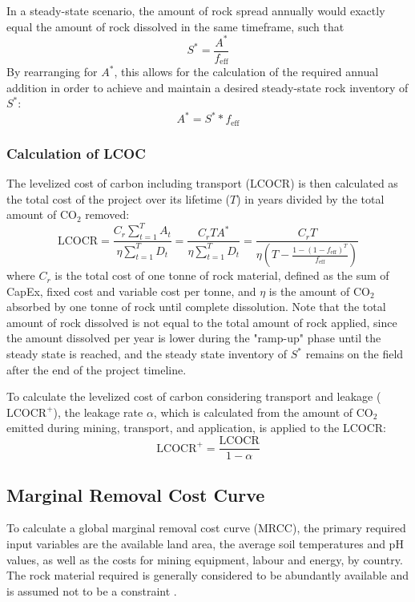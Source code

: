 In a steady-state scenario, the amount of rock spread annually would exactly equal the amount of rock dissolved in the same timeframe, such that
\begin{equation}
  S^* = \frac{A^*}{f_{\text{eff}}}
\end{equation}
By rearranging for \(A^*\), this allows for the calculation of the required annual addition in order to achieve and maintain a desired steady-state rock inventory of \(S^*\):
\begin{equation}
  A^* = S^* * f_{\text{eff}}
\end{equation}

\subsubsection{Calculation of LCOC}
The levelized cost of carbon including transport (LCOCR) is then calculated as the total cost of the project over its lifetime ($T$) in years divided by the total amount of CO$_2$ removed:
\begin{equation}
  \text{LCOCR} = \frac{C_r \sum_{t=1}^{T} A_t}{\eta \sum_{t=1}^{T} D_t} = \frac{C_r T A^*}{\eta \sum_{t=1}^{T} D_t} = \frac{C_rT}{\eta\left(T-\frac{1-(1-f_{\text{eff}})^T}{f_{\text{eff}}}\right)}
\end{equation}
where \(C_r\) is the total cost of one tonne of rock material, defined as the sum of CapEx, fixed cost and variable cost per tonne, and \(\eta\) is the amount of CO$_2$ absorbed by one tonne of rock until complete dissolution.
Note that the total amount of rock dissolved is not equal to the total amount of rock applied, since the amount dissolved per year is lower during the "ramp-up" phase until the steady state is reached, and the steady state inventory of \(S^*\) remains on the field after the end of the project timeline.\vspace{2mm}

To calculate the levelized cost of carbon considering transport and leakage (\(\text{LCOCR}^+\)), the leakage rate \(\alpha\), which is calculated from the amount of CO$_2$ emitted during mining, transport, and application, is applied to the LCOCR:
\begin{equation}
  \text{LCOCR}^+ = \frac{\text{LCOCR}}{1-\alpha}
\end{equation}

\subsection{Marginal Removal Cost Curve}
To calculate a global marginal removal cost curve (MRCC), the primary required input variables are the available land area, the average soil temperatures and pH values, as well as the costs for mining equipment, labour and energy, by country. The rock material required is generally considered to be abundantly available and is assumed not to be a constraint \parencite{hangx_coastal_2009, strefler_potential_2018}.\vspace{2mm}

